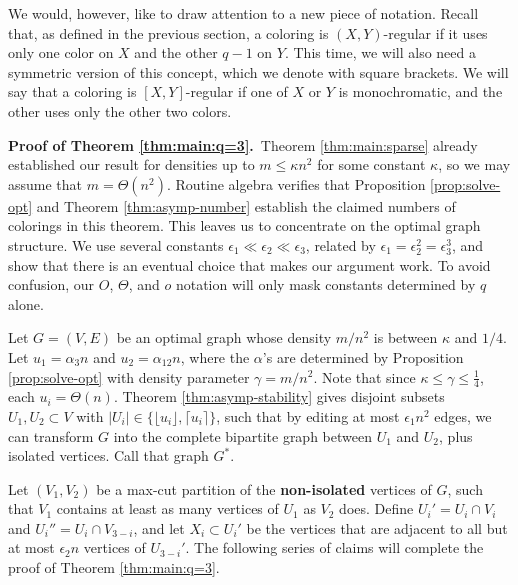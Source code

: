 \documentclass[11pt]{article}
\begin{document}
We would, however, like to draw attention to a new piece of notation.
Recall that, as defined in the previous section, a coloring is $(X,
Y)$-regular if it uses only one color on $X$ and the other $q-1$ on
$Y$.  This time, we will also need a symmetric version of this
concept, which we denote with square brackets.  We will say that a
coloring is $[X, Y]$-regular if one of $X$ or $Y$ is monochromatic,
and the other uses only the other two colors.



\vspace{3mm}

\noindent \textbf{Proof of Theorem \ref{thm:main:q=3}.}\, Theorem
\ref{thm:main:sparse} already established our result for densities up
to $m \leq \kappa n^2$ for some constant $\kappa$, so we may assume
that $m = \Theta(n^2)$.  Routine algebra verifies that Proposition
\ref{prop:solve-opt} and Theorem \ref{thm:asymp-number} establish the
claimed numbers of colorings in this theorem.  This leaves us to
concentrate on the optimal graph structure.  We use several constants
$\epsilon_1 \ll \epsilon_2 \ll \epsilon_3$, related by $\epsilon_1 =
\epsilon_2^2 = \epsilon_3^3$, and show that there is an eventual
choice that makes our argument work.  To avoid confusion, our $O$,
$\Theta$, and $o$ notation will only mask constants determined by $q$
alone.

Let $G = (V, E)$ be an optimal graph whose density $m/n^2$ is between
$\kappa$ and $1/4$.  Let $u_1 = \alpha_3 n$ and $u_2 = \alpha_{12} n$,
where the $\alpha$'s are determined by Proposition
\ref{prop:solve-opt} with density parameter $\gamma = m/n^2$.  Note
that since $\kappa \leq \gamma \leq \frac{1}{4}$, each $u_i =
\Theta(n)$.  Theorem \ref{thm:asymp-stability} gives disjoint subsets
$U_1, U_2 \subset V$ with $|U_i| \in \{\lfloor u_i \rfloor, \lceil u_i
\rceil\}$, such that by editing at most $\epsilon_1 n^2$ edges, we can
transform $G$ into the complete bipartite graph between $U_1$ and
$U_2$, plus isolated vertices.  Call that graph $G^*$.

Let $(V_1, V_2)$ be a max-cut partition of the \textbf{non-isolated}
vertices of $G$, such that $V_1$ contains at least as many vertices of
$U_1$ as $V_2$ does.  Define $U_i' = U_i \cap V_i$ and $U_i'' = U_i
\cap V_{3-i}$, and let $X_i \subset U_i'$ be the vertices that are
adjacent to all but at most $\epsilon_2 n$ vertices of $U_{3-i}'$.
The following series of claims will complete the proof of Theorem
\ref{thm:main:q=3}.
\end{document}
